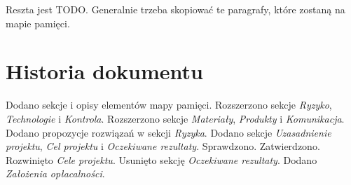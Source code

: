 \documentclass[10pt]{dokument-ppi}
\begin{document}
Reszta jest \textsc{TODO}. Generalnie trzeba skopiować te paragrafy, które
zostaną na mapie pamięci.

\newpage
\section*{Historia dokumentu}
\begin{versions}
        Dodano sekcje i opisy elementów mapy pamięci.
        Rozszerzono sekcje \emph{Ryzyko}, \emph{Technologie} i \emph{Kontrola}.
        Rozszerzono sekcje \emph{Materiały}, \emph{Produkty} i \emph{Komunikacja}.
        Dodano propozycje rozwiązań w sekcji \emph{Ryzyka}.
        Dodano sekcje \emph{Uzasadnienie projektu}, \emph{Cel projektu} i
        \emph{Oczekiwane rezultaty}.
        Sprawdzono.
        Zatwierdzono.
        Rozwinięto \emph{Cele projektu}. Usunięto sekcję \emph{Oczekiwane
        rezultaty}. Dodano \emph{Założenia opłacalności}.
\end{versions}
\end{document}
